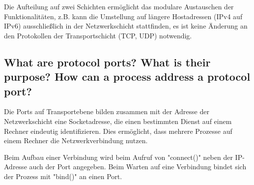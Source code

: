 \documentclass[a4paper,
			llpt,
			solution,
			accentcolor=tud2d,
			colorbacktitle
			]
			{tudexercise}
\begin{document}
Die Aufteilung auf zwei Schichten ermöglicht das modulare Austauschen der Funktionalitäten, z.B. kann die Umstellung auf längere Hostadressen (IPv4 auf IPv6) ausschließlich in der Netzwerkschicht stattfinden, es ist keine Änderung an den Protokollen der Transportschicht (TCP, UDP) notwendig.


\subsection{What are protocol ports? What is their purpose? How can a process address a protocol port?}
Die Ports auf Transportebene bilden zusammen mit der Adresse der Netzwerkschicht eine Socketadresse, die einen bestimmten Dienst auf einem Rechner eindeutig identifizieren. Dies ermöglicht, dass mehrere Prozesse auf einem Rechner die Netzwerkverbindung nutzen.

Beim Aufbau einer Verbindung wird beim Aufruf von "connect()" neben der IP-Adresse auch der Port angegeben. Beim Warten auf eine Verbindung bindet sich der Prozess mit "bind()" an einen Port.

\clearpage
\end{document}
